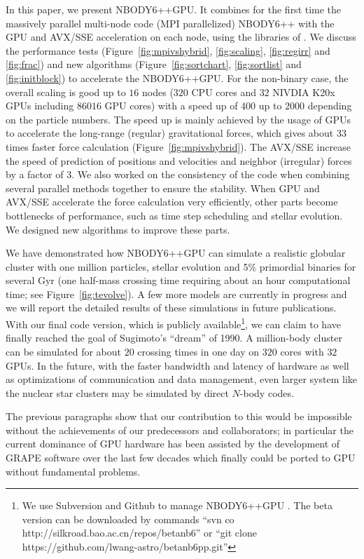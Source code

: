 \documentclass[usenatbib,aas_macros]{mn2e}
\def\nbodypp{NBODY6++ }
\def\nbodyppgpu{NBODY6++GPU }
\def\nb{$N$-body }
\begin{document}
In this paper, we present NBODY6++GPU.
It combines for the first time the massively parallel multi-node code (MPI parallelized) \nbodypp \citep{Spurzem1999, Hemsendorf2003} with the GPU and AVX/SSE acceleration on each node, using the libraries of \cite{Nitadori2012}. 
We discuss the performance tests (Figure~\ref{fig:mpivshybrid}, \ref{fig:scaling}, \ref{fig:regirr} and \ref{fig:frac}) and new algorithms (Figure~\ref{fig:sortchart}, \ref{fig:sortlist} and \ref{fig:initblock}) to accelerate the NBODY6++GPU. 
For the non-binary case, the overall scaling is good up to $16$ nodes ($320$ CPU cores and $32$ NIVDIA K20x GPUs including $86016$ GPU cores) with a speed up of $400$ up to $2000$ depending on the particle numbers. 
The speed up is mainly achieved by the usage of GPUs to accelerate the long-range (regular) gravitational forces, which gives about $33$ times faster force calculation (Figure~\ref{fig:mpivshybrid}). 
The AVX/SSE increase the speed of prediction of positions and velocities and neighbor (irregular) forces by a factor of $3$. 
We also worked on the consistency of the code when combining several parallel methods together to ensure the stability.
When GPU and AVX/SSE accelerate the force calculation very efficiently, other parts become bottlenecks of performance, such as time step scheduling and stellar evolution. We designed new algorithms to improve these parts.

We have demonstrated how \nbodyppgpu can simulate a realistic globular cluster with one million particles, stellar evolution and 5\% primordial binaries for several Gyr (one half-mass crossing time requiring about an hour computational time; see Figure~\ref{fig:tevolve}). A few more models are currently in progress and we will report the detailed results of these simulations in future publications.
With our final code version, which is publicly available\footnote{We use Subversion and Github to manage \nbodyppgpu. The beta version can be downloaded by commands ``svn co http://silkroad.bao.ac.cn/repos/betanb6'' or ``git clone https://github.com/lwang-astro/betanb6pp.git''}, we can claim to have finally reached the goal of Sugimoto's ``dream'' of 1990. 
A million-body cluster can be simulated for about $20$ crossing times in one day on $320$ cores with $32$ GPUs.
In the future, with the faster bandwidth and latency of hardware as well as optimizations of communication and data management, even larger system like the nuclear star clusters may be simulated by direct \nb codes.

The previous paragraphs show that our contribution to this would be impossible without the achievements of our predecessors and collaborators; in particular the current dominance of GPU hardware has been assisted by the development of GRAPE software over the last few decades which finally could be ported to GPU without fundamental problems.
\end{document}
